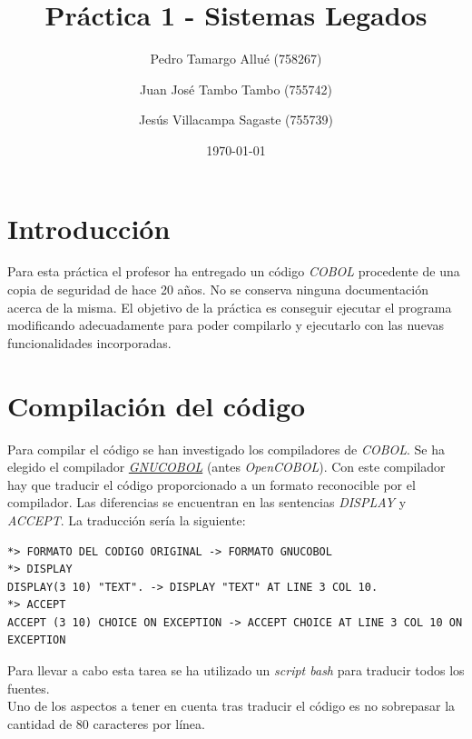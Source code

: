 \documentclass[10pt,a4paper]{article}
\begin{document}
\begin{titlepage}
\title{\textbf{{\Huge Práctica 1 - Sistemas Legados}}}
\author{
	Pedro Tamargo Allué (758267)
	\and
	Juan José Tambo Tambo (755742)
	\and
	Jesús Villacampa Sagaste (755739)
}
\date{\today}
\clearpage\maketitle
\thispagestyle{empty}
\tableofcontents
\listoffigures
\end{titlepage}

\section{Introducción}

Para esta práctica el profesor ha entregado un código \emph{COBOL} procedente de una copia de seguridad de hace 20 años. No se conserva ninguna documentación acerca de la misma. El objetivo de la práctica es conseguir ejecutar el programa modificando adecuadamente para poder compilarlo y ejecutarlo con las nuevas funcionalidades incorporadas.

\section{Compilación del código}

Para compilar el código se han investigado los compiladores de \emph{COBOL}. Se ha elegido el compilador \href{https://sourceforge.net/projects/gnucobol/}{\emph{GNUCOBOL}} (antes \emph{OpenCOBOL}). Con este compilador hay que traducir el código proporcionado a un formato reconocible por el compilador. Las diferencias se encuentran en las sentencias \emph{DISPLAY} y \emph{ACCEPT}. La traducción sería la siguiente:

\begin{lstlisting}
*> FORMATO DEL CODIGO ORIGINAL -> FORMATO GNUCOBOL
*> DISPLAY
DISPLAY(3 10) "TEXT". -> DISPLAY "TEXT" AT LINE 3 COL 10.
*> ACCEPT 
ACCEPT (3 10) CHOICE ON EXCEPTION -> ACCEPT CHOICE AT LINE 3 COL 10 ON EXCEPTION
\end{lstlisting}

Para llevar a cabo esta tarea se ha utilizado un \emph{script bash} para traducir todos los fuentes.\\

Uno de los aspectos a tener en cuenta tras traducir el código es no sobrepasar la cantidad de 80 caracteres por línea.\\
\end{document}
